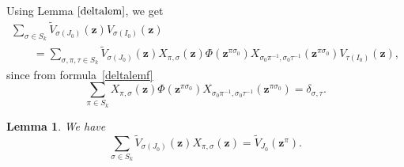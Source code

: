 \documentclass[10pt,a4paper]{amsart}
\numberwithin{equation}{section}
\newtheorem{Lemma}[Theorem]{Lemma}
\begin{document}
Using Lemma $\ref{deltalem}$, we get{\samepage
\begin{gather}
\sum_{\sigma\in S_k} \widetilde{V}_{\sigma(J_0)}(\boldsymbol{z}) V_{\sigma(I_0)}(\boldsymbol{z} ) \nonumber\\
\qquad{}=\sum_{\sigma,\pi,\tau\in S_k} \widetilde{V}_{\sigma(J_0)}(\boldsymbol{z})X_{\pi,\sigma}(\boldsymbol{z}) \Phi(\boldsymbol{z}^{\pi\sigma_0})X_{\sigma_0\pi^{-1},\sigma_0\tau^{-1}}(\boldsymbol{z}^{\pi\sigma_0})V_{\tau(I_0)}(\boldsymbol{z}),\label{longeq}
\end{gather}}%
since from formula~\eqref{deltalemf}
\begin{equation*}
\sum_{\pi\in S_k} X_{\pi,\sigma}(\boldsymbol{z}) \Phi(\boldsymbol{z}^{\pi\sigma_0})X_{\sigma_0\pi^{-1},\sigma_0\tau^{-1}}(\boldsymbol{z}^{\pi\sigma_0}) =\delta_{\sigma,\tau}.
\end{equation*}
\begin{Lemma}\label{sum1} We have
\begin{equation}\label{sumvx}
\sum_{\sigma\in S_k} \widetilde{V}_{\sigma(J_0)}(\boldsymbol{z})X_{\pi,\sigma}(\boldsymbol{z})=\widetilde{V}_{J_0}(\boldsymbol{z}^\pi).
\end{equation}
\end{Lemma}
\end{document}
